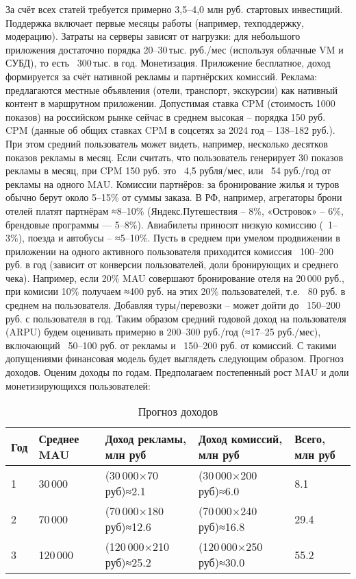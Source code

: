За счёт всех статей требуется примерно 3,5–4,0 млн руб. стартовых инвестиций. Поддержка включает первые месяцы работы (например, техподдержку, модерацию). Затраты на серверы зависят от нагрузки: для небольшого приложения достаточно порядка 20–30 тыс. руб./мес (используя облачные VM и СУБД), то есть ~300 тыс. в год.
Монетизация. Приложение бесплатное, доход формируется за счёт нативной рекламы и партнёрских комиссий. Реклама: предлагаются местные объявления (отели, транспорт, экскурсии) как нативный контент в маршрутном приложении. Допустимая ставка CPM (стоимость 1000 показов) на российском рынке сейчас в среднем высокая – порядка 150 руб. CPM (данные об общих ставках CPM в соцсетях за 2024 год – 138–182 руб.). При этом средний пользователь может видеть, например, несколько десятков показов рекламы в месяц. Если считать, что пользователь генерирует 30 показов рекламы в месяц, при CPM 150 руб. это ~4,5 рубля/мес, или ~54 руб./год от рекламы на одного MAU.
Комиссии партнёров: за бронирование жилья и туров обычно берут около 5–15\% от суммы заказа. В РФ, например, агрегаторы брони отелей платят партнёрам ≈8–10\% (Яндекс.Путешествия – 8\%, «Островок» – 6\%, брендовые программы — 5–8\%). Авиабилеты приносят низкую комиссию (~1–3\%), поезда и автобусы – ≈5–10\%. Пусть в среднем при умелом продвижении в приложении на одного активного пользователя приходится комиссия ~100–200 руб. в год (зависит от конверсии пользователей, доли бронирующих и среднего чека). Например, если 20\% MAU совершают бронирование отеля на 20 000 руб., при комисии 10\% получаем ≈400 руб. на этих 20\% пользователей, т.е. ~80 руб. в среднем на пользователя. Добавляя туры/перевозки – может дойти до ~150–200 руб. с пользователя в год.
Таким образом средний годовой доход на пользователя (ARPU) будем оценивать примерно в 200–300 руб./год (≈17–25 руб./мес), включающий ~50–100 руб. от рекламы и ~150–200 руб. от комиссий. С такими допущениями финансовая модель будет выглядеть следующим образом.
Прогноз доходов. Оценим доходы по годам. Предполагаем постепенный рост MAU и доли монетизирующихся пользователей:

\begin{table}[h]
\centering
\begin{tabular}{| p{20mm} | p{30mm} | p{35mm} | p{35mm} | p{25mm} |}
\hline
\textbf{Год} & \textbf{Среднее MAU} & \textbf{Доход рекламы, млн руб} & \textbf{Доход комиссий, млн руб} & \textbf{Всего, млн руб} \\
\hline
1 & 30\,000 & (30\,000×70 руб)≈2.1 & (30\,000×200 руб)≈6.0 & 8.1 \\
\hline
2 & 70\,000 & (70\,000×180 руб)≈12.6 & (70\,000×240 руб)≈16.8 & 29.4 \\
\hline
3 & 120\,000 & (120\,000×210 руб)≈25.2 & (120\,000×250 руб)≈30.0 & 55.2 \\
\hline
\end{tabular}
\caption{Прогноз доходов}
\end{table}

